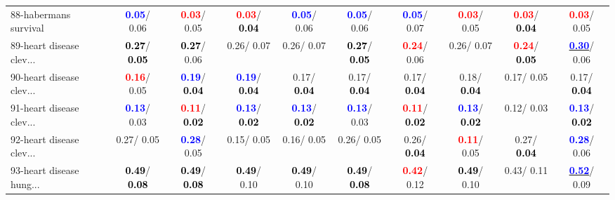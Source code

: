 \begin{table}[h]
\begin{center}
{\begin{tabular}{lc|c|c|c|c|c|c|c|c}
88-habermans survival & \textcolor{blue}{\textbf{  0.05}}/  0.06 & \textcolor{red}{\textbf{  0.03}}/  0.05 & \textcolor{red}{\textbf{  0.03}}/\textcolor{black}{\textbf{  0.04}} & \textcolor{blue}{\textbf{  0.05}}/  0.06 & \textcolor{blue}{\textbf{  0.05}}/  0.06 & \textcolor{blue}{\textbf{  0.05}}/  0.07 & \textcolor{red}{\textbf{  0.03}}/  0.05 & \textcolor{red}{\textbf{  0.03}}/\textcolor{black}{\textbf{  0.04}} & \textcolor{red}{\textbf{  0.03}}/  0.05 \\
89-heart disease clev... & \textcolor{black}{\textbf{  0.27}}/\textcolor{black}{\textbf{  0.05}} & \textcolor{black}{\textbf{  0.27}}/  0.06 &   0.26/  0.07 &   0.26/  0.07 & \textcolor{black}{\textbf{  0.27}}/\textcolor{black}{\textbf{  0.05}} & \textcolor{red}{\textbf{  0.24}}/  0.06 &   0.26/  0.07 & \textcolor{red}{\textbf{  0.24}}/\textcolor{black}{\textbf{  0.05}} & \underline{\textcolor{blue}{\textbf{  0.30}}}/  0.06 \\
90-heart disease clev... & \textcolor{red}{\textbf{  0.16}}/  0.05 & \textcolor{blue}{\textbf{  0.19}}/\textcolor{black}{\textbf{  0.04}} & \textcolor{blue}{\textbf{  0.19}}/\textcolor{black}{\textbf{  0.04}} &   0.17/\textcolor{black}{\textbf{  0.04}} &   0.17/\textcolor{black}{\textbf{  0.04}} &   0.17/\textcolor{black}{\textbf{  0.04}} &   0.18/\textcolor{black}{\textbf{  0.04}} &   0.17/  0.05 &   0.17/\textcolor{black}{\textbf{  0.04}} \\
91-heart disease clev... & \textcolor{blue}{\textbf{  0.13}}/  0.03 & \textcolor{red}{\textbf{  0.11}}/\textcolor{black}{\textbf{  0.02}} & \textcolor{blue}{\textbf{  0.13}}/\textcolor{black}{\textbf{  0.02}} & \textcolor{blue}{\textbf{  0.13}}/\textcolor{black}{\textbf{  0.02}} & \textcolor{blue}{\textbf{  0.13}}/  0.03 & \textcolor{red}{\textbf{  0.11}}/\textcolor{black}{\textbf{  0.02}} & \textcolor{blue}{\textbf{  0.13}}/\textcolor{black}{\textbf{  0.02}} &   0.12/  0.03 & \textcolor{blue}{\textbf{  0.13}}/\textcolor{black}{\textbf{  0.02}} \\
92-heart disease clev... &   0.27/  0.05 & \textcolor{blue}{\textbf{  0.28}}/  0.05 &   0.15/  0.05 &   0.16/  0.05 &   0.26/  0.05 &   0.26/\textcolor{black}{\textbf{  0.04}} & \textcolor{red}{\textbf{  0.11}}/  0.05 &   0.27/\textcolor{black}{\textbf{  0.04}} & \textcolor{blue}{\textbf{  0.28}}/  0.06 \\ \hline
93-heart disease hung... & \textcolor{black}{\textbf{  0.49}}/\textcolor{black}{\textbf{  0.08}} & \textcolor{black}{\textbf{  0.49}}/\textcolor{black}{\textbf{  0.08}} & \textcolor{black}{\textbf{  0.49}}/  0.10 & \textcolor{black}{\textbf{  0.49}}/  0.10 & \textcolor{black}{\textbf{  0.49}}/\textcolor{black}{\textbf{  0.08}} & \textcolor{red}{\textbf{  0.42}}/  0.12 & \textcolor{black}{\textbf{  0.49}}/  0.10 &   0.43/  0.11 & \underline{\textcolor{blue}{\textbf{  0.52}}}/  0.09 \\

\end{tabular}}
\end{center}
\end{table}
